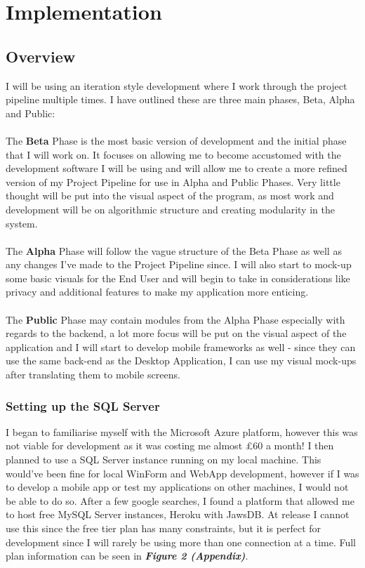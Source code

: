 \documentclass[a4paper,11pt]{proc}
\begin{document}
\section{Implementation}
\subsection{Overview}
I will be using an iteration style development where I work through the project pipeline multiple times. I have outlined these are three main phases, Beta, Alpha and Public:\\
\\The \textbf{Beta} Phase is the most basic version of development and the initial phase that I will work on. It focuses on allowing me to become accustomed with the development software I will be using and will allow me to create a more refined version of my Project Pipeline for use in Alpha and Public Phases. Very little thought will be put into the visual aspect of the program, as most work and development will be on algorithmic structure and creating modularity in the system.\\
\\The \textbf{Alpha} Phase will follow the vague structure of the Beta Phase as well as any changes I've made to the Project Pipeline since. I will also start to mock-up some basic visuals for the End User and will begin to take in considerations like privacy and additional features to make my application more enticing.\\
\\The \textbf{Public} Phase may contain modules from the Alpha Phase especially with regards to the backend, a lot more focus will be put on the visual aspect of the application and I will start to develop mobile frameworks as well - since they can use the same back-end as the Desktop Application, I can use my visual mock-ups after translating them to mobile screens.


\subsubsection{Setting up the SQL Server}
I began to familiarise myself with the Microsoft Azure platform, however this was not viable for development as it was costing me almost £60 a month! I then planned to use a SQL Server instance running on my local machine. This would've been fine for local WinForm and WebApp development, however if I was to develop a mobile app or test my applications on other machines, I would not be able to do so. After a few google searches, I found a platform that allowed me to host free MySQL Server instances, Heroku with JawsDB. At release I cannot use this since the free tier plan has many constraints, but it is perfect for development since I will rarely be using more than one connection at a time. Full plan information can be seen in \textbf{\textit{Figure 2 (Appendix)}}.
\end{document}
